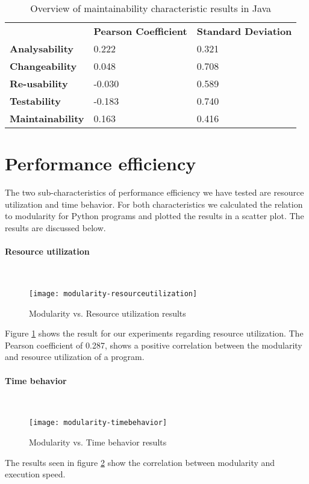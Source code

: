 \documentclass[twoside]{uva-inf-bachelor-thesis}
\newcommand{\myparagraph}[1]{\paragraph{#1}\mbox{}\\}
\begin{document}
\begin{table}[H]
\centering
\caption{Overview of maintainability characteristic results in Java}
\label{table:main-overview-java}
\begin{tabular}{lll}
                         & \textbf{Pearson Coefficient} & \textbf{Standard Deviation} \\
\textbf{Analysability}   & 0.222                        & 0.321                       \\
\textbf{Changeability}   & 0.048                        & 0.708                       \\
\textbf{Re-usability}    & -0.030                       & 0.589                       \\
\textbf{Testability}     & -0.183                       & 0.740                       \\
\textbf{Maintainability} & 0.163                        & 0.416                      
\end{tabular}
\end{table}

\section{Performance efficiency}
The two sub-characteristics of performance efficiency we have tested are resource utilization and time behavior. For both characteristics we calculated the relation to modularity for Python programs and plotted the results in a scatter plot. The results are discussed below.

\myparagraph{Resource utilization}
\begin{figure}[H]
    \label{figure:perf-res}
    \caption{Modularity vs. Resource utilization results}
    \centering
        \texttt{[image: modularity-resourceutilization]}
\end{figure}

Figure \ref{figure:perf-res} shows the result for our experiments regarding resource utilization. The Pearson coefficient of 0.287, shows a positive correlation between the modularity and resource utilization of a program.

\myparagraph{Time behavior}
\begin{figure}[H]
    \label{figure:perf-time}
    \caption{Modularity vs. Time behavior results}
    \centering
        \texttt{[image: modularity-timebehavior]}
\end{figure}

The results seen in figure \ref{figure:perf-time} show the correlation between modularity and execution speed. 
\end{document}
